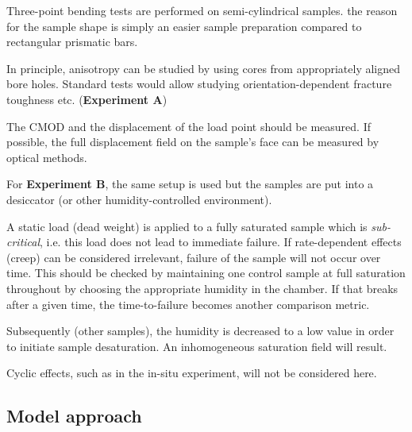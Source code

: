 \begin{list}{-}{\leftmargin=1em \itemindent=0em \itemsep=0em}
	\item Three-point bending tests are performed on semi-cylindrical samples. the reason for the sample shape is simply an easier sample preparation compared to rectangular prismatic bars.
	\item In principle, anisotropy can be studied by using cores from appropriately aligned bore holes. Standard tests would allow studying orientation-dependent fracture toughness etc. (\textbf{Experiment A})
	\item The CMOD and the displacement of the load point should be measured. If possible, the full displacement field on the sample's face can be measured by optical methods.
	\item For \textbf{Experiment B}, the same setup is used but the samples are put into a desiccator (or other humidity-controlled environment).
	\item A static load (dead weight) is applied to a fully saturated sample which is \textit{sub-critical}, i.e. this load does not lead to immediate failure. If rate-dependent effects (creep) can be considered irrelevant, failure of the sample will not occur over time. This should be checked by maintaining one control sample at full saturation throughout by choosing the appropriate humidity in the chamber. If that breaks after a given time, the time-to-failure becomes another comparison metric.
	\item Subsequently (other samples), the humidity is decreased to a low value in order to initiate sample desaturation. An inhomogeneous saturation field will result.
	\item Cyclic effects, such as in the in-situ experiment, will not be considered here.
\end{list} 

\subsection{Model approach}

